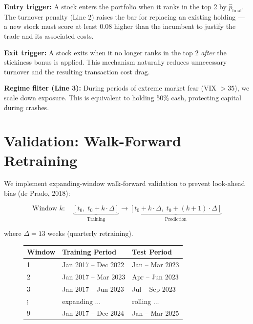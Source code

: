 \documentclass[12pt,a4paper]{article}
\begin{document}
\textbf{Entry trigger:} A stock enters the portfolio when it ranks in the top 2 by $\hat{p}_{\text{final}}$. The turnover penalty (Line 2) raises the bar for replacing an existing holding --- a new stock must score at least 0.08 higher than the incumbent to justify the trade and its associated costs.

\textbf{Exit trigger:} A stock exits when it no longer ranks in the top 2 \emph{after} the stickiness bonus is applied. This mechanism naturally reduces unnecessary turnover and the resulting transaction cost drag.

\textbf{Regime filter (Line 3):} During periods of extreme market fear (VIX $> 35$), we scale down exposure. This is equivalent to holding 50\% cash, protecting capital during crashes.

\section{Validation: Walk-Forward Retraining}

We implement expanding-window walk-forward validation to prevent look-ahead bias (de Prado, 2018):

\begin{equation}
    \text{Window } k: \quad \underbrace{[t_0, \; t_0 + k \cdot \Delta]}_{\text{Training}} \rightarrow \underbrace{[t_0 + k\cdot\Delta, \; t_0 + (k+1)\cdot\Delta]}_{\text{Prediction}}
\end{equation}

where $\Delta = 13$ weeks (quarterly retraining).

\begin{figure}[H]
\centering
\begin{tabular}{lll}
\toprule
\textbf{Window} & \textbf{Training Period} & \textbf{Test Period} \\
\midrule
1 & Jan 2017 -- Dec 2022 & Jan -- Mar 2023 \\
2 & Jan 2017 -- Mar 2023 & Apr -- Jun 2023 \\
3 & Jan 2017 -- Jun 2023 & Jul -- Sep 2023 \\
$\vdots$ & expanding $\ldots$ & rolling $\ldots$ \\
9 & Jan 2017 -- Dec 2024 & Jan -- Mar 2025 \\
\bottomrule
\end{tabular}
\end{figure}
\end{document}
